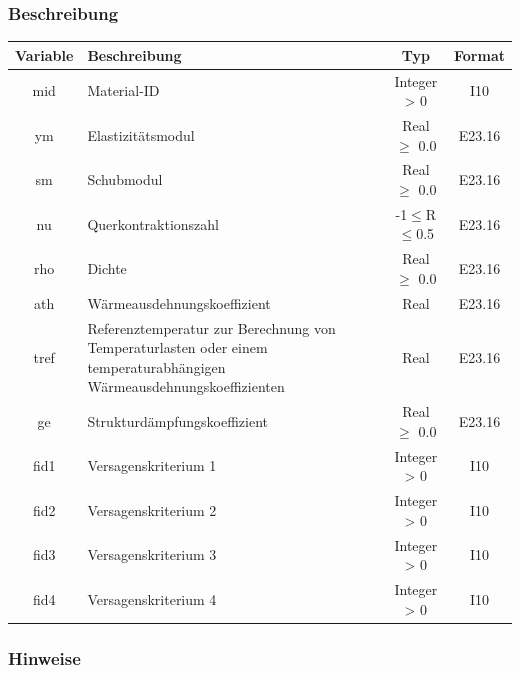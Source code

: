 \documentclass[11pt,titlepage,listof=totoc,bibliography=totoc,twoside]{scrreprt}
\begin{document}
{{\subsubsection{Beschreibung}

\begin{tabularx}{\textwidth}{cXcc}
\toprule
Variable& Beschreibung														& Typ			& Format\\
\midrule
mid	& Material-ID														& Integer > 0		& I10	\\
ym	& Elastizitätsmodul													& Real $\ge$ 0.0	& E23.16\\
sm	& Schubmodul														& Real $\ge$ 0.0	& E23.16\\
nu	& Querkontraktionszahl													& -1$\le$R$\le$0.5	& E23.16\\
rho	& Dichte														& Real $\ge$ 0.0	& E23.16\\
ath	& Wärmeausdehnungskoeffizient												& Real			& E23.16\\
tref	& Referenztemperatur zur Berechnung von Temperaturlasten oder einem temperaturabhängigen Wärmeausdehnungskoeffizienten	& Real			& E23.16\\
ge	& Strukturdämpfungskoeffizient												& Real $\ge$ 0.0	& E23.16\\
fid1	& Versagenskriterium 1													& Integer > 0		& I10	\\
fid2	& Versagenskriterium 2													& Integer > 0		& I10	\\
fid3	& Versagenskriterium 3													& Integer > 0		& I10	\\
fid4	& Versagenskriterium 4													& Integer > 0		& I10	\\
\bottomrule
\end{tabularx}

\subsubsection{Hinweise}

}}
\end{document}
